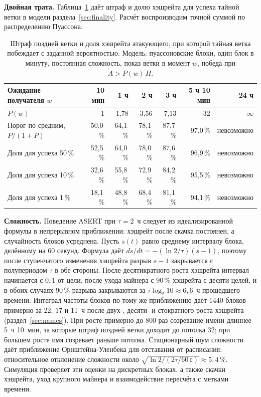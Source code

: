 \documentclass[10pt,a4paper]{article}
\begin{document}
\textbf{Двойная трата.}
Таблица~\ref{tab:penalty} даёт штраф и долю хэшрейта для успеха тайной ветки в модели раздела~\ref{sec:finality}.
Расчёт воспроизводим точной суммой по распределению Пуассона.

\begin{table}[t]
\centering\small
\caption{Штраф поздней ветки и доля хэшрейта атакующего, при которой тайная ветка побеждает с заданной вероятностью. Модель: пуассоновские блоки, один блок в минуту, постоянная сложность, показ ветки в момент $w$, победа при $A>P(w)\,H$.}
\label{tab:penalty}
\footnotesize
\begin{tabular}{lrrrrrr}
\toprule
Ожидание получателя $w$ & 10 мин & 1 ч & 2 ч & 3 ч & 5 ч 10 мин & 24 ч \\
\midrule
$P(w)$ & 1 & 1,78 & 3,56 & 7,13 & 32 & $\infty$ \\
Порог по средним, $P/(1+P)$ & 50,0\,\% & 64,1\,\% & 78,1\,\% & 87,7\,\% & 97,0\,\% & невозможно \\
Доля для успеха 50\,\% & 52,5\,\% & 64,0\,\% & 78,0\,\% & 87,6\,\% & 96,9\,\% & невозможно \\
Доля для успеха 10\,\% & 32,6\,\% & 55,8\,\% & 72,9\,\% & 84,2\,\% & 95,5\,\% & невозможно \\
Доля для успеха 1\,\% & 18,1\,\% & 48,8\,\% & 68,4\,\% & 81,1\,\% & 94,1\,\% & невозможно \\
\bottomrule
\end{tabular}
\end{table}

\textbf{Сложность.}
Поведение ASERT при $\tau=2$~ч следует из идеализированной формулы в непрерывном приближении: хэшрейт после скачка постоянен, а случайность блоков усреднена.
Пусть $s(t)$ равно среднему интервалу блока, делённому на 60 секунд.
Формула даёт $ds/dt=-(\ln 2/\tau)(s-1)$, поэтому после ступенчатого изменения хэшрейта разрыв $s-1$ закрывается с полупериодом $\tau$ в обе стороны.
После десятикратного роста хэшрейта интервал начинается с $0{,}1$ от цели, после ухода майнера с 90\,\% хэшрейта с десяти целей, и в обоих случаях 90\,\% разрыва закрываются за $\tau\log_2 10\approx6{,}6$~ч прошедшего времени.
Интеграл частоты блоков по тому же приближению даёт 1440 блоков примерно за 22, 17 и 11~ч после двух-, десяти- и стократного роста хэшрейта (раздел~\ref{sec:names}).
При росте примерно до 800 раз созревание имени длиннее 5~ч 10~мин, за которые штраф поздней ветки доходит до потолка 32; при большем росте имя созревает раньше потолка.
Стационарный шум сложности даёт приближение Орнштейна-Уленбека для отставания от расписания: относительное отклонение сложности около $\sqrt{\ln 2/(2\tau/60\,\text{с})}\approx5{,}4\,\%$.
Симуляция проверяет эти оценки на дискретных блоках, а также скачки хэшрейта, уход крупного майнера и взаимодействие пересчёта с метками времени.
\end{document}
